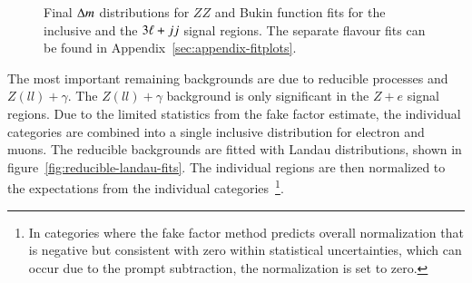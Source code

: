  
\begin{figure}[htbp]
    \centering
	\caption{Final $\Delta m$ distributions for $ZZ$ and Bukin function fits for the inclusive and the $3\ell+jj$ signal regions. The separate flavour fits can be found in Appendix~\ref{sec:appendix-fitplots}.}
	\label{fig:ZZ-DiBosonFit}
\end{figure}



The most important remaining backgrounds are due to reducible processes and $Z(ll)+\gamma$. The $Z(ll)+\gamma$ background is only significant in the $Z+e$ signal regions. Due to the limited statistics from the fake factor estimate, the individual categories are combined into a single inclusive distribution for electron and muons. The reducible backgrounds are fitted with Landau distributions, shown in figure~\ref{fig:reducible-landau-fits}. The individual regions are then normalized to the expectations from the individual categories~\footnote{In categories where the fake factor method predicts overall normalization that is negative but consistent with zero within statistical uncertainties, which can occur due to the prompt subtraction, the normalization is set to zero.}.


